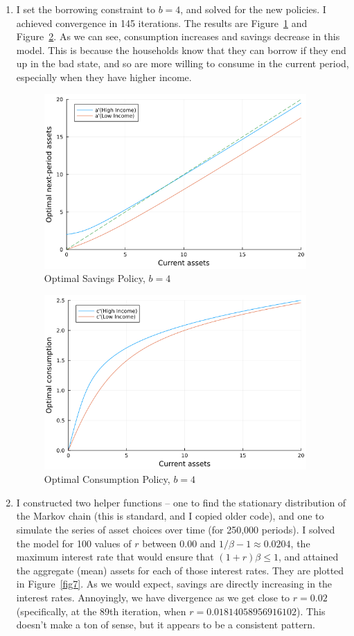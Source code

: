\documentclass[10pt]{article}
\begin{document}
\begin{enumerate}
	\item I set the borrowing constraint to $b = 4$, and solved for the new policies. I achieved convergence in 145 iterations. The results are Figure~\ref{fig5} and Figure~\ref{fig6}. As we can see, consumption increases and savings decrease in this model. This is because the households know that they can borrow if they end up in the bad state, and so are more willing to consume in the current period, especially when they have higher income. \begin{figure}[H] \centering \includegraphics[width=10cm]{macro_hw4_code/savings_policy_function3.png}\caption{Optimal Savings Policy, $b=4$}\label{fig5}\end{figure}\begin{figure}[H] \centering \includegraphics[width=10cm]{macro_hw4_code/consumption_policy_function3.png}\caption{Optimal Consumption Policy, $b=4$}\label{fig6}\end{figure}\newpage
	\item I constructed two helper functions -- one to find the stationary distribution of the Markov chain (this is standard, and I copied older code), and one to simulate the series of asset choices over time (for 250,000 periods). I solved the model for 100 values of $r$ between 0.00 and $1/\beta - 1 \approx 0.0204$, the maximum interest rate that would ensure that $(1+r)\beta \le 1$, and attained the aggregate (mean) assets for each of those interest rates. They are plotted in Figure~\ref{fig7}. As we would expect, savings are directly increasing in the interest rates. Annoyingly, we have divergence as we get close to $r = 0.02$ (specifically, at the 89th iteration, when $r = 0.01814058956916102$). This doesn't make a ton of sense, but it appears to be a consistent pattern. 

\end{enumerate}
\end{document}
